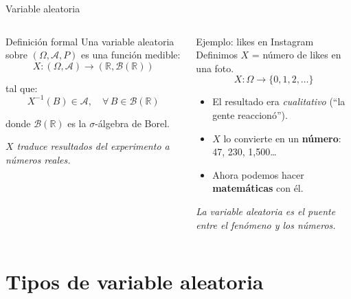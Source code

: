 \documentclass[aspectratio=169, 11pt]{beamer}
\begin{document}
\begin{frame}{Variable aleatoria}
\begin{columns}[T]
\begin{block}{Definici\'on formal}
Una \alert{variable aleatoria} sobre $(\Omega, \mathcal{A}, P)$ es una funci\'on medible:
\[
  X: (\Omega, \mathcal{A}) \to (\mathbb{R}, \mathcal{B}(\mathbb{R}))
\]

tal que:
\[
  X^{-1}(B) \in \mathcal{A}, \quad \forall\, B \in \mathcal{B}(\mathbb{R})
\]

donde $\mathcal{B}(\mathbb{R})$ es la $\sigma$-\'algebra de Borel.

\vspace{0.3em}
\textit{$X$ traduce resultados del experimento a n\'umeros reales.}
\end{block}

\begin{exampleblock}{Ejemplo: likes en Instagram}
Definimos $X$ = n\'umero de likes en una foto.
\[
  X: \Omega \to \{0, 1, 2, \dots\}
\]

\vspace{0.3em}
\begin{itemize}
  \item El resultado era \textit{cualitativo} (``la gente reaccion\'o'').
  \item $X$ lo convierte en un \textbf{n\'umero}: 47, 230, 1{,}500\dots
  \item Ahora podemos hacer \textbf{matem\'aticas} con \'el.
\end{itemize}

\vspace{0.3em}
\textit{La variable aleatoria es el puente entre el fen\'omeno y los n\'umeros.}
\end{exampleblock}
\end{columns}
\end{frame}

\section{Tipos de variable aleatoria}
\end{document}
